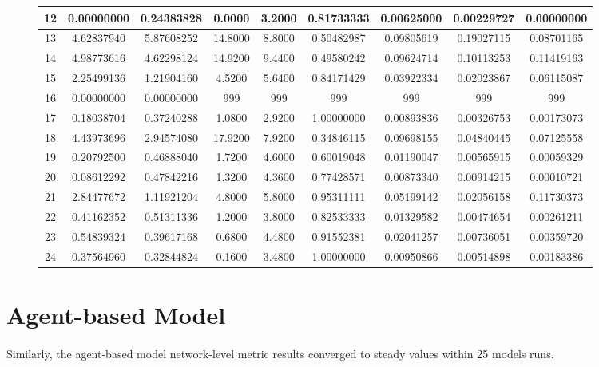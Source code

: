 \documentclass[12pt,a4paper]{thesis}
\begin{document}
\begin{figure}[H]
\begin{tabular}{|c|c|c|c|c|c|c|c|c|}
\hline	12	&	0.00000000	&	0.24383828	&	0.0000	&	3.2000	&	0.81733333	&	0.00625000	&	0.00229727	&	0.00000000	\\
\hline	13	&	4.62837940	&	5.87608252	&	14.8000	&	8.8000	&	0.50482987	&	0.09805619	&	0.19027115	&	0.08701165	\\
\hline	14	&	4.98773616	&	4.62298124	&	14.9200	&	9.4400	&	0.49580242	&	0.09624714	&	0.10113253	&	0.11419163	\\
\hline	15	&	2.25499136	&	1.21904160	&	4.5200	&	5.6400	&	0.84171429	&	0.03922334	&	0.02023867	&	0.06115087	\\
\hline	16	&	0.00000000	&	0.00000000	&	999	&	999	&	999	&	999	&	999	&	999	\\
\hline	17	&	0.18038704	&	0.37240288	&	1.0800	&	2.9200	&	1.00000000	&	0.00893836	&	0.00326753	&	0.00173073	\\
\hline	18	&	4.43973696	&	2.94574080	&	17.9200	&	7.9200	&	0.34846115	&	0.09698155	&	0.04840445	&	0.07125558	\\
\hline	19	&	0.20792500	&	0.46888040	&	1.7200	&	4.6000	&	0.60019048	&	0.01190047	&	0.00565915	&	0.00059329	\\
\hline	20	&	0.08612292	&	0.47842216	&	1.3200	&	4.3600	&	0.77428571	&	0.00873340	&	0.00914215	&	0.00010721	\\
\hline	21	&	2.84477672	&	1.11921204	&	4.8000	&	5.8000	&	0.95311111	&	0.05199142	&	0.02056158	&	0.11730373	\\
\hline	22	&	0.41162352	&	0.51311336	&	1.2000	&	3.8000	&	0.82533333	&	0.01329582	&	0.00474654	&	0.00261211	\\
\hline	23	&	0.54839324	&	0.39617168	&	0.6800	&	4.4800	&	0.91552381	&	0.02041257	&	0.00736051	&	0.00359720	\\
\hline	24	&	0.37564960	&	0.32844824	&	0.1600	&	3.4800	&	1.00000000	&	0.00950866	&	0.00514898	&	0.00183386	\\
\hline 
\end{tabular} 
\end{figure}

\section{Agent-based Model}

\paragraph{}
Similarly, the agent-based model network-level metric results converged to steady values within 25 models runs.
\end{document}
